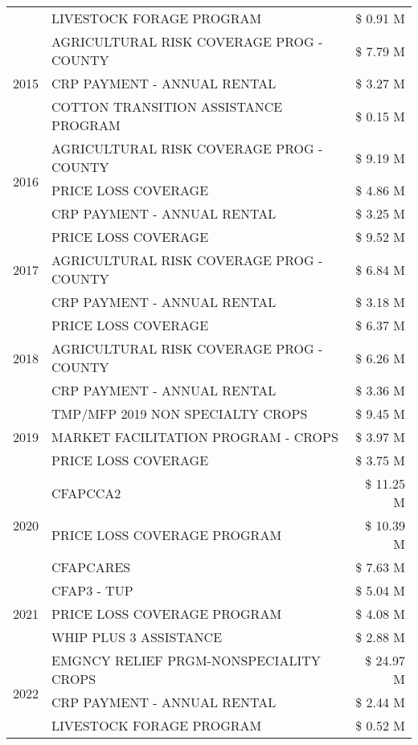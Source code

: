 \begin{tabular}{llr}
 & LIVESTOCK FORAGE PROGRAM & \$ 0.91 M \\
\cline{1-3}
\multirow[t]{3}{*}{2015} & AGRICULTURAL RISK COVERAGE PROG - COUNTY & \$ 7.79 M \\
 & CRP PAYMENT - ANNUAL RENTAL & \$ 3.27 M \\
 & COTTON TRANSITION ASSISTANCE PROGRAM & \$ 0.15 M \\
\cline{1-3}
\multirow[t]{3}{*}{2016} & AGRICULTURAL RISK COVERAGE PROG - COUNTY & \$ 9.19 M \\
 & PRICE LOSS COVERAGE & \$ 4.86 M \\
 & CRP PAYMENT - ANNUAL RENTAL & \$ 3.25 M \\
\cline{1-3}
\multirow[t]{3}{*}{2017} & PRICE LOSS COVERAGE & \$ 9.52 M \\
 & AGRICULTURAL RISK COVERAGE PROG - COUNTY & \$ 6.84 M \\
 & CRP PAYMENT - ANNUAL RENTAL & \$ 3.18 M \\
\cline{1-3}
\multirow[t]{3}{*}{2018} & PRICE LOSS COVERAGE & \$ 6.37 M \\
 & AGRICULTURAL RISK COVERAGE PROG - COUNTY & \$ 6.26 M \\
 & CRP PAYMENT - ANNUAL RENTAL & \$ 3.36 M \\
\cline{1-3}
\multirow[t]{3}{*}{2019} & TMP/MFP 2019 NON SPECIALTY CROPS & \$ 9.45 M \\
 & MARKET FACILITATION PROGRAM - CROPS & \$ 3.97 M \\
 & PRICE LOSS COVERAGE & \$ 3.75 M \\
\cline{1-3}
\multirow[t]{3}{*}{2020} & CFAPCCA2 & \$ 11.25 M \\
 & PRICE LOSS COVERAGE PROGRAM & \$ 10.39 M \\
 & CFAPCARES & \$ 7.63 M \\
\cline{1-3}
\multirow[t]{3}{*}{2021} & CFAP3 - TUP & \$ 5.04 M \\
 & PRICE LOSS COVERAGE PROGRAM & \$ 4.08 M \\
 & WHIP PLUS 3 ASSISTANCE & \$ 2.88 M \\
\cline{1-3}
\multirow[t]{3}{*}{2022} & EMGNCY RELIEF PRGM-NONSPECIALITY CROPS & \$ 24.97 M \\
 & CRP PAYMENT - ANNUAL RENTAL & \$ 2.44 M \\
 & LIVESTOCK FORAGE PROGRAM & \$ 0.52 M \\
\cline{1-3}
\bottomrule
\end{tabular}
